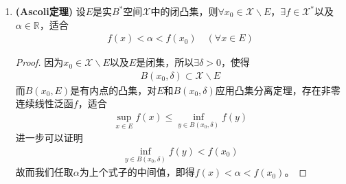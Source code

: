 \begin{enumerate}[leftmargin=2cm, label=\arabic*]
		\begin{proof}
			考虑两个凸集的分离问题。我们想办法把它转化为一个凸集与其外一点的分离问题，在$B^*$中，若$E_1,E_2$是两个互不相交的凸集，$E_1$是有内点的，那么容易推知
			\begin{align*}
				E \triangleq E_1 + (-1)E_2
			\end{align*}
			是一个非空凸集，并且有内点，此外$\theta\notin E$。倘若不然，则$\exists x_1\in E_1$，$x_2\in E_2$，使得$x_1 - x_2 = \theta$。从而
			\begin{align*}
				x_1 = x_2 \in E_1\cap E_2
			\end{align*}
			这与$E_1\cap E_2= \varnothing$矛盾。由几何形式的Hahn-Banach定理，存在闭超平面$H_f^r$分解$E$和$\theta$，不妨假定
			\begin{align*}
				f(x)\leqslant r\ (\forall x\in E) \quad f(\theta)\geqslant r
			\end{align*}
			从而$f(x)\leqslant 0\ (\forall x\in E)$，即有$\eqnmarkbox[red]{1}{f(y-z) \leqslant 0}\ (\forall y\in E_1,\forall x\in E_2)$。再由$f$的线性得到：
			\vspace{0.5em}
			
			\begin{align*}
				f(y) \leqslant f(z) \quad (\forall y\in E_1, \forall z\in E_2)
			\end{align*}
			因此$\exists s\in\mathbb{R}$，使得
			\begin{align*}
				\sup\limits_{y\in E_1} f(y) \leqslant s\leqslant \inf\limits_{z\in E_2} f(z)
			\end{align*}
			于是$H_f^s$分离$E_1$和$E_2$，而由$H_f^r$是闭的可知$H_f^s$也是闭的。
			
			而条件可以减弱为$\mathring{E}_1\cap E_2=\varnothing$。由于$E_1$有内点，则$\mathring{E}_1$有内点。
		\end{proof}
		
		\item \textbf{(Ascoli定理)} 设$E$是实$B^*$空间$\mathscr{X}$中的闭凸集，则$\forall x_0\in\mathscr{X}\backslash E$，$\exists f\in\mathscr{X}^*$以及$\alpha\in\mathbb{R}$，适合
		\begin{align*}
			f(x) < \alpha < f(x_0) \quad (\forall x\in E)
		\end{align*}
		\begin{proof}
			因为$x_0\in\mathscr{X}\backslash E$以及$E$是闭集，所以$\exists\delta>0$，使得
			\begin{align*}
				B(x_0,\delta) \subset \mathscr{X}\backslash E
			\end{align*}
			而$B(x_0, E)$是有内点的凸集，对$E$和$B(x_0,\delta)$应用凸集分离定理，存在非零连续线性泛函$f$，适合
			\begin{align*}
				\sup\limits_{x\in E}f(x) \leqslant \inf\limits_{y\in B(x_0, \delta)} f(y)
			\end{align*}
			进一步可以证明
			\begin{align*}
				\inf\limits_{y\in B(x_0, \delta)} f(y) < f(x_0)
			\end{align*}
			故而我们任取$\alpha$为上个式子的中间值，即得$f(x)<\alpha<f(x_0)$。
		\end{proof}
		

\end{enumerate}
